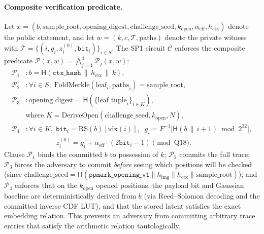 \documentclass{article}
\theoremstyle{plain}
\theoremstyle{definition}
\theoremstyle{remark}
\begin{document}
\paragraph{Composite verification predicate.}
Let $x=(b, \mathrm{sample\_root}, \mathrm{opening\_digest}, \mathrm{challenge\_seed}, k_{\mathrm{open}}, \alpha_{\mathrm{eff}}, h_{\mathrm{ctx}})$ denote the public statement, and let $w=(k, c, \mathcal{T}, \mathrm{paths})$ denote the private witness with $\mathcal{T}=\{(i,g_i,z_i^{(0)},\mathtt{bit}_i)\}_{i \in S}$. The SP1 circuit $\mathcal{C}$ enforces the composite predicate $\mathcal{P}(x, w) = \bigwedge_{j=1}^{4} \mathcal{P}_j(x, w)$:
\begin{align*}
\mathcal{P}_1&: b = \mathsf{H}(\texttt{ctx\_hash} \,\|\, h_{\mathrm{ctx}} \,\|\, k), \\
\mathcal{P}_2&: \forall i \in S,\; \mathrm{FoldMerkle}(\mathrm{leaf}_i, \mathrm{paths}_i) = \mathrm{sample\_root}, \\
\mathcal{P}_3&: \mathrm{opening\_digest} = \mathsf{H}\!\left( \{\mathrm{leaf\_tuple}_i\}_{i \in K} \right), \\
&\text{where } K = \mathrm{DeriveOpen}(\mathrm{challenge\_seed}, k_{\mathrm{open}}, N), \\
\mathcal{P}_4&: \forall i \in K,\;
  \mathtt{bit}_i = \mathrm{RS}(b)[\mathrm{idx}(i)], \;\;
  g_i = F^{-1}\!\bigl[\mathsf{H}(b \,\|\, i{+}1) \bmod 2^{32}\bigr], \\
  &\qquad\qquad\; z_i^{(0)} = g_i + \alpha_{\mathrm{eff}} \cdot (2\mathtt{bit}_i - 1) \pmod{\text{Q18}}.
\end{align*}
Clause $\mathcal{P}_1$ binds the committed $b$ to possession of $k$; $\mathcal{P}_2$ commits the full trace; $\mathcal{P}_3$ forces the adversary to commit \emph{before} seeing which positions will be checked (since $\mathrm{challenge\_seed} = \mathsf{H}(\texttt{ppmark\_opening\_v1} \| h_{\mathrm{img}} \| h_{\mathrm{ctx}} \| \mathrm{sample\_root})$); and $\mathcal{P}_4$ enforces that on the $k_{\mathrm{open}}$ opened positions, the payload bit and Gaussian baseline are deterministically derived from $b$ (via Reed--Solomon decoding and the committed inverse-CDF LUT), and that the stored latent satisfies the exact embedding relation. This prevents an adversary from committing arbitrary trace entries that satisfy the arithmetic relation tautologically.
\end{document}
